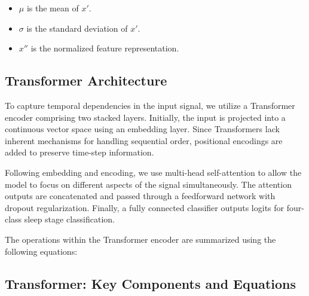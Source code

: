 \begin{itemize}
	\item $\mu$ is the mean of $x'$.
	\item $\sigma$ is the standard deviation of $x'$.
	\item $x''$ is the normalized feature representation.
\end{itemize}


\subsection{Transformer Architecture}

To capture temporal dependencies in the input signal, we utilize a Transformer encoder comprising two stacked layers. Initially, the input is projected into a continuous vector space using an embedding layer. Since Transformers lack inherent mechanisms for handling sequential order, positional encodings are added to preserve time-step information. 

Following embedding and encoding, we use multi-head self-attention to allow the model to focus on different aspects of the signal simultaneously. The attention outputs are concatenated and passed through a feedforward network with dropout regularization. Finally, a fully connected classifier outputs logits for four-class sleep stage classification.

The operations within the Transformer encoder are summarized using the following equations:
\subsection{Transformer: Key Components and Equations}

